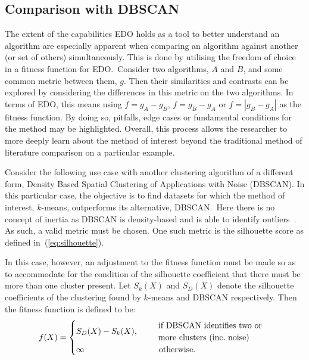 \documentclass[smallextended]{svjour3}
\begin{document}
\subsection{Comparison with DBSCAN}

The extent of the capabilities EDO holds as a tool to better understand an
algorithm are especially apparent when comparing an algorithm against another
(or set of others) simultaneously. This is done by utilising the freedom of
choice in a fitness function for EDO.\ Consider two algorithms, \(A\) and \(B\),
and some common metric between them, \(g\). Then their similarities and
contrasts can be explored by considering the differences in this metric on the
two algorithms. In terms of EDO, this means using \(f = g_A - g_B\), \(f = g_B -
g_A\) or \(f = \left| g_B - g_A \right|\) as the fitness function. By doing so,
pitfalls, edge cases or fundamental conditions for the method may be
highlighted. Overall, this process allows the researcher to more deeply learn
about the method of interest beyond the traditional method of literature
comparison on a particular example.

Consider the following use case with another clustering algorithm of a different
form, Density Based Spatial Clustering of Applications with Noise (DBSCAN). In
this particular case, the objective is to find datasets for which the method of
interest, \(k\)-means, outperforms its alternative, DBSCAN.\ Here there is no
concept of inertia as DBSCAN is density-based and is able to identify
outliers~\cite{Ester1996}. As such, a valid metric must be chosen. One such
metric is the silhouette score as defined in~(\ref{eq:silhouette}).

In this case, however, an adjustment to the fitness function must be made so as
to accommodate for the condition of the silhouette coefficient that there must
be more than one cluster present. Let \(S_k (X)\) and \(S_D (X)\) denote the
silhouette coefficients of the clustering found by \(k\)-means and DBSCAN
respectively. Then the fitness function is defined to be:
\begin{equation}
    f(X) = 
        \begin{cases}
            S_D (X) - S_k (X), &\quad \text{%
                \begin{tabular}{l}%
                    if DBSCAN identifies two or
                    \\
                    more clusters (inc.\ noise)
                \end{tabular}
            }\\
            \infty &\quad \ \ \text{otherwise.}
        \end{cases}\label{eq:dbscan-fitness}
\end{equation}
\end{document}

